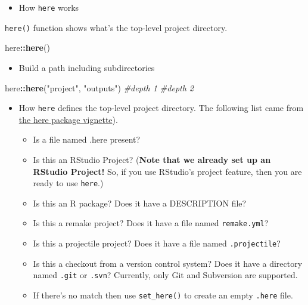\documentclass[
]{book}
\newenvironment{Shaded}{\begin{snugshade}}{\end{snugshade}}
\newcommand{\CommentTok}[1]{\textcolor[rgb]{0.56,0.35,0.01}{\textit{#1}}}
\newcommand{\KeywordTok}[1]{\textcolor[rgb]{0.13,0.29,0.53}{\textbf{#1}}}
\newcommand{\NormalTok}[1]{#1}
\newcommand{\OperatorTok}[1]{\textcolor[rgb]{0.81,0.36,0.00}{\textbf{#1}}}
\newcommand{\StringTok}[1]{\textcolor[rgb]{0.31,0.60,0.02}{#1}}
\providecommand{\tightlist}{%
  \setlength{\itemsep}{0pt}\setlength{\parskip}{0pt}}
\begin{document}
\begin{itemize}
\tightlist
\item
  How \texttt{here} works
\end{itemize}

\texttt{here()} function shows what's the top-level project directory.

\begin{Shaded}
\begin{Highlighting}[]
\NormalTok{here}\OperatorTok{::}\KeywordTok{here}\NormalTok{()}
\end{Highlighting}
\end{Shaded}

\begin{itemize}
\tightlist
\item
  Build a path including subdirectories
\end{itemize}

\begin{Shaded}
\begin{Highlighting}[]
\NormalTok{here}\OperatorTok{::}\KeywordTok{here}\NormalTok{(}\StringTok{"project"}\NormalTok{, }\StringTok{"outputs"}\NormalTok{)}
           \CommentTok{\#depth 1   \#depth 2}
\end{Highlighting}
\end{Shaded}

\begin{itemize}
\item
  How \texttt{here} defines the top-level project directory. The following list came from \href{https://github.com/jennybc/here_here}{the here package vignette}).

  \begin{itemize}
  \item
    Is a file named .here present?
  \item
    Is this an RStudio Project? (\textbf{Note that we already set up an RStudio Project!} So, if you use RStudio's project feature, then you are ready to use \texttt{here}.)
  \item
    Is this an R package? Does it have a DESCRIPTION file?
  \item
    Is this a remake project? Does it have a file named \texttt{remake.yml}?
  \item
    Is this a projectile project? Does it have a file named \texttt{.projectile}?
  \item
    Is this a checkout from a version control system? Does it have a directory named \texttt{.git} or \texttt{.svn}? Currently, only Git and Subversion are supported.
  \item
    If there's no match then use \texttt{set\_here()} to create an empty \texttt{.here} file.
  \end{itemize}
\end{itemize}
\end{document}
